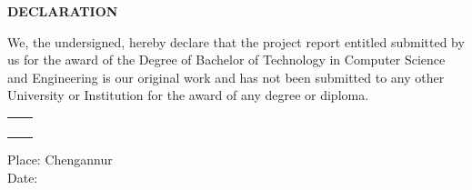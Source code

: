 \begin{center}
	\LARGE \textbf{DECLARATION}
\end{center}

\vspace{1cm}

\noindent We, the undersigned, hereby declare that the project report entitled \textbf{\tplProjectTitle} submitted by us for the award of the Degree of Bachelor of Technology in Computer Science and Engineering is our original work and has not been submitted to any other University or Institution for the award of any degree or diploma.

\vspace{2cm}

\begin{tabular}{l r}
	\textbf{\tplStudentA} & \dotfill \\
	\textbf{\tplStudentB} & \dotfill \\
	\textbf{\tplStudentC} & \dotfill \\
	\textbf{\tplStudentD} & \dotfill \\
\end{tabular}

\vspace{1cm}

\noindent Place: Chengannur \\
\noindent Date: \tplSubmissionDate
